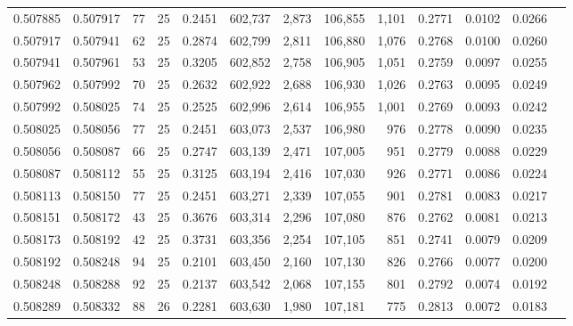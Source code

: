 \begin{tabular}{rrrrrrrrrrrrr}
0.507885 & 0.507917 &  77 &  25 &                                     0.2451 & 602,737 &   2,873 & 106,855 &   1,101 & 0.2771 & 0.0102 & 0.0266 \\
0.507917 & 0.507941 &  62 &  25 &                                     0.2874 & 602,799 &   2,811 & 106,880 &   1,076 & 0.2768 & 0.0100 & 0.0260 \\
0.507941 & 0.507961 &  53 &  25 &                                     0.3205 & 602,852 &   2,758 & 106,905 &   1,051 & 0.2759 & 0.0097 & 0.0255 \\
0.507962 & 0.507992 &  70 &  25 &                                     0.2632 & 602,922 &   2,688 & 106,930 &   1,026 & 0.2763 & 0.0095 & 0.0249 \\
0.507992 & 0.508025 &  74 &  25 &                                     0.2525 & 602,996 &   2,614 & 106,955 &   1,001 & 0.2769 & 0.0093 & 0.0242 \\
0.508025 & 0.508056 &  77 &  25 &                                     0.2451 & 603,073 &   2,537 & 106,980 &     976 & 0.2778 & 0.0090 & 0.0235 \\
0.508056 & 0.508087 &  66 &  25 &                                     0.2747 & 603,139 &   2,471 & 107,005 &     951 & 0.2779 & 0.0088 & 0.0229 \\
0.508087 & 0.508112 &  55 &  25 &                                     0.3125 & 603,194 &   2,416 & 107,030 &     926 & 0.2771 & 0.0086 & 0.0224 \\
0.508113 & 0.508150 &  77 &  25 &                                     0.2451 & 603,271 &   2,339 & 107,055 &     901 & 0.2781 & 0.0083 & 0.0217 \\
0.508151 & 0.508172 &  43 &  25 &                                     0.3676 & 603,314 &   2,296 & 107,080 &     876 & 0.2762 & 0.0081 & 0.0213 \\
0.508173 & 0.508192 &  42 &  25 &                                     0.3731 & 603,356 &   2,254 & 107,105 &     851 & 0.2741 & 0.0079 & 0.0209 \\
0.508192 & 0.508248 &  94 &  25 &                                     0.2101 & 603,450 &   2,160 & 107,130 &     826 & 0.2766 & 0.0077 & 0.0200 \\
0.508248 & 0.508288 &  92 &  25 &                                     0.2137 & 603,542 &   2,068 & 107,155 &     801 & 0.2792 & 0.0074 & 0.0192 \\
0.508289 & 0.508332 &  88 &  26 &                                     0.2281 & 603,630 &   1,980 & 107,181 &     775 & 0.2813 & 0.0072 & 0.0183 \\

\end{tabular}
